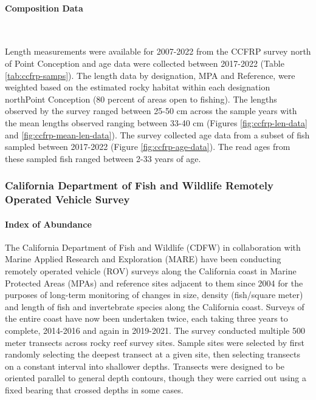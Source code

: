 \documentclass[11pt,
  english,
  letterpaper,
]{article}
\begin{document}
\hypertarget{composition-data-2}{%
\paragraph{Composition Data}\label{composition-data-2}}

~

Length measurements were available for 2007-2022 from the CCFRP survey north of Point Conception and age data were collected between 2017-2022 (Table \ref{tab:ccfrp-samps}). The length data by designation, MPA and Reference, were weighted based on the estimated rocky habitat within each designation northPoint Conception (80 percent of areas open to fishing). The lengths observed by the survey ranged between 25-50 cm across the sample years with the mean lengths observed ranging between 33-40 cm (Figures \ref{fig:ccfrp-len-data} and \ref{fig:ccfrp-mean-len-data}). The survey collected age data from a subset of fish sampled between 2017-2022 (Figure \ref{fig:ccfrp-age-data}). The read ages from these sampled fish ranged between 2-33 years of age.

\hypertarget{california-department-of-fish-and-wildlife-remotely-operated-vehicle-survey}{%
\subsubsection{California Department of Fish and Wildlife Remotely Operated Vehicle Survey}\label{california-department-of-fish-and-wildlife-remotely-operated-vehicle-survey}}

\hypertarget{index-of-abundance-1}{%
\paragraph{Index of Abundance}\label{index-of-abundance-1}}

\hfill\break

The California Department of Fish and Wildlife (CDFW) in collaboration with Marine Applied Research and Exploration (MARE) have been conducting remotely operated vehicle (ROV) surveys along the California coast in Marine Protected Areas (MPAs) and reference sites adjacent to them since 2004 for the purposes of long-term monitoring of changes in size, density (fish/square meter) and length of fish and invertebrate species along the California coast. Surveys of the entire coast have now been undertaken twice, each taking three years to complete, 2014-2016 and again in 2019-2021. The survey conducted multiple 500 meter transects across rocky reef survey sites. Sample sites were selected by first randomly selecting the deepest transect at a given site, then selecting transects on a constant interval into shallower depths. Transects were designed to be oriented parallel to general depth contours, though they were carried out using a fixed bearing that crossed depths in some cases.
\end{document}

